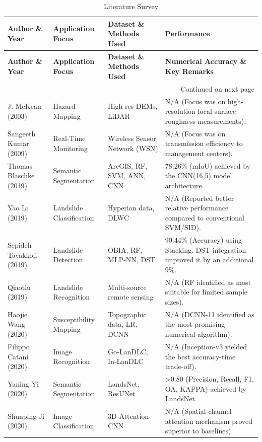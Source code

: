 \documentclass[11pt,a4paper]{article}
\begin{document}
\begin{longtable}{p{3cm} p{3cm} p{4cm} p{5cm}}
\caption{Literature Survey} \\
\toprule
\textbf{Author \& Year} & \textbf{Application Focus} & \textbf{Dataset \& Methods Used} & \textbf{Performance} \\
\midrule
\endfirsthead
\toprule
\textbf{Author \& Year} & \textbf{Application Focus} & \textbf{Dataset \& Methods Used} & \textbf{Numerical Accuracy \& Key Remarks} \\
\midrule
\endhead
\midrule
\multicolumn{4}{r}{{Continued on next page}} \\
\endfoot
\bottomrule
\endlastfoot
J. McKean (2003) \cite{mckean2003} & Hazard Mapping & High-res DEMs, LiDAR & N/A (Focus was on high-resolution local surface roughness measurements). \\
Sangeeth Kumar (2009) \cite{kumar2009} & Real-Time Monitoring & Wireless Sensor Network (WSN) & N/A (Focus was on transmission efficiency to management centers). \\
Thomas Blaschke (2019) \cite{ghorbanzadeh2019unet} & Semantic Segmentation & ArcGIS, RF, SVM, ANN, CNN & 78.26\% (mIoU) achieved by the CNN(16,5) model architecture. \\
Yao Li (2019) \cite{li2019} & Landslide Classification & Hyperion data, DLWC & N/A (Reported better relative performance compared to conventional SVM/SID). \\
Sepideh Tavakkoli (2019) \cite{tavakkoli2019} & Landslide Detection & OBIA, RF, MLP-NN, DST & 90.44\% (Accuracy) using Stacking. DST integration improved it by an additional 9\%. \\
Qiaotlu (2019) \cite{qiao2019} & Landslide Recognition & Multi-source remote sensing & N/A (RF identified as most suitable for limited sample sizes). \\
Haojie Wang (2020) \cite{wang2021landslide} & Susceptibility Mapping & Topographic data, LR, DCNN & N/A (DCNN-11 identified as the most promising numerical algorithm). \\
Filippo Catani (2020) \cite{catani2020} & Image Recognition & Go-LanDLC, In-LanDLC & N/A (Inception-v3 yielded the best accuracy-time trade-off). \\
Yaning Yi (2020) \cite{yi2020} & Semantic Segmentation & LandsNet, ResUNet & >0.80 (Precision, Recall, F1, OA, KAPPA) achieved by LandsNet. \\
Shunping Ji (2020) \cite{ji2020} & Image Classification & 3D-Attention CNN & N/A (Spatial channel attention mechanism proved superior to baselines). \\

\end{longtable}
\end{document}
